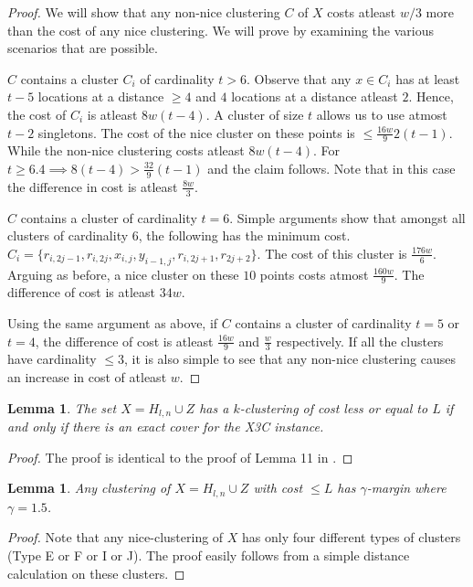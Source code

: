 \documentclass{article}
\newtheorem{lemma}[theorem]{Lemma}
\begin{document}
\begin{proof}
We will show that any non-nice clustering $C$ of $X$ costs atleast $w/3$ more than the cost of any nice clustering. We will prove by examining the various  scenarios that are possible.

$C$ contains a cluster $C_i$ of cardinality $t > 6$. Observe that any $x \in C_i$ has at least $t-5$ locations at a distance $\ge 4$ and $4$ locations at a distance atleast $2$. Hence, the cost of $C_i$ is atleast $8w(t-4)$. A cluster of size $t$ allows us to use atmost $t-2$ singletons. The cost of the nice cluster on these points is $\le \frac{16w}{9}2(t-1)$. While the non-nice clustering costs atleast $8w(t-4)$. For $t \ge 6.4 \implies 8(t-4) > \frac{32}{9}(t-1)$ and the claim follows. Note that in this case the difference in cost is atleast $\frac{8w}{3}$. 

$C$ contains a cluster of cardinality $t = 6$. Simple arguments show that amongst all clusters of cardinality $6$, the following has the minimum cost. $C_i = \{r_{i, 2j-1}, r_{i, 2j}, x_{i,j}, y_{i-1, j}, r_{i, 2j+1}, r_{2j+2}\}$. The cost of this cluster is $\frac{176w}{6}$. Arguing as before, a nice cluster on these $10$ points costs atmost $\frac{160w}{9}$. The difference of cost is atleast $34w$.  

Using the same argument as above, if $C$ contains a cluster of cardinality $t = 5$ or $t = 4$, the difference of cost is atleast $\frac{16w}{9}$ and $\frac{w}{3}$ respectively. If all the clusters have cardinality $\le 3$, it is also simple to see that any non-nice clustering causes an increase in cost of atleast $w$.
\end{proof}

\begin{lemma}
\label{lemma:kmeansEquivalenceX3C}
The set $X = H_{l,n} \cup Z$ has a $k$-clustering of cost less or equal to $L$ if and only if there is an exact cover for the X3C instance.
\end{lemma}
\begin{proof}
The proof is identical to the proof of Lemma 11 in \cite{vattani2009hardness}.
\end{proof}

\begin{lemma}
\label{lemma:gammaLower}
Any clustering of $X = H_{l,n} \cup Z$ with cost $\le L$ has $\gamma$-margin where $\gamma = 1.5$.
\end{lemma}
\begin{proof}
Note that any nice-clustering of $X$ has only four different types of clusters (Type E or F or I or J). The proof easily follows from a simple distance calculation on these clusters.
\end{proof}
\end{document}

